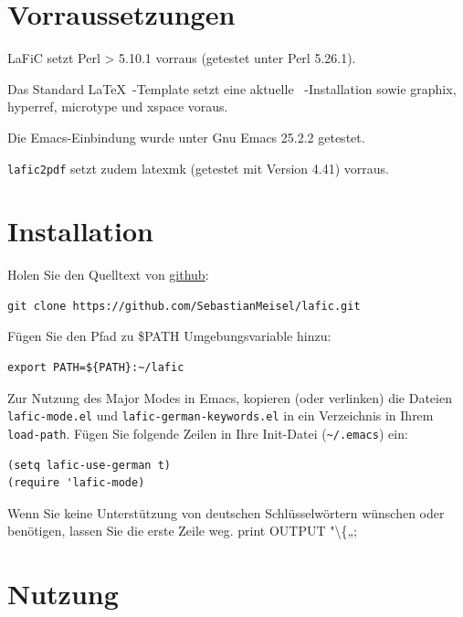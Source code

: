 \documentclass{scrartcl}
\begin{document}
\section{Vorraussetzungen}

LaFiC setzt Perl > 5.10.1 vorraus (getestet unter Perl 5.26.1).

Das Standard \LaTeX\ -Template setzt eine aktuelle
\XeLaTeX\ -Installation sowie graphix, hyperref, microtype und
xspace voraus.

Die Emacs-Einbindung wurde unter Gnu Emacs 25.2.2 getestet.

\texttt{lafic2pdf} setzt zudem latexmk (getestet mit Version 4.41) vorraus.

\section{Installation}
\label{Installation}

Holen Sie den Quelltext von \href{https://github.com}{github}:

\begin{verbatim}
git clone https://github.com/SebastianMeisel/lafic.git

\end{verbatim}

Fügen Sie den Pfad zu \$PATH Umgebungsvariable hinzu:

\begin{verbatim}
export PATH=${PATH}:~/lafic

\end{verbatim}

Zur Nutzung des Major Modes in Emacs, kopieren (oder
verlinken) die Dateien \texttt{lafic-mode.el} und
\texttt{lafic-german-keywords.el} in ein Verzeichnis in Ihrem
\texttt{load-path}. Fügen Sie folgende Zeilen in Ihre Init-Datei
(\texttt{\textasciitilde /.emacs}) ein:

\begin{verbatim}
(setq lafic-use-german t)
(require 'lafic-mode)

\end{verbatim}

Wenn Sie keine Unterstützung von deutschen Schlüsselwörtern
wünschen oder benötigen, lassen Sie die erste Zeile weg.
	print OUTPUT "\textbackslash \{„;

\section{Nutzung}
\end{document}
